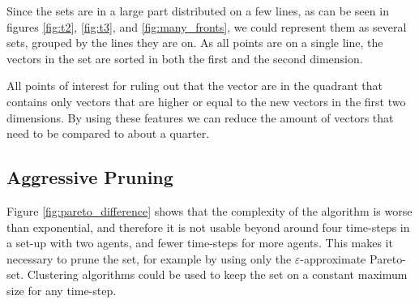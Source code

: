 \documentclass{article}
\begin{document}
\begin{multicols}{2}
		Since the sets are in a large part distributed on a few lines, as can be
		seen in figures \ref{fig:t2}, \ref{fig:t3}, and \ref{fig:many_fronts}, we
		could represent them as several sets, grouped by the lines they are on.
		As all points are on a single line, the vectors in the set are sorted in
		both the first and the second dimension.

		All points of interest for ruling out that the vector are in the quadrant
		that contains only vectors that are higher or equal to the new vectors in
		the first two dimensions. By using these features we can reduce the
		amount of vectors that need to be compared to about a quarter.

	\subsection{Aggressive Pruning}
		\label{sub:aggressive_pruning}
		Figure \ref{fig:pareto_difference} shows that the complexity of the
		algorithm is worse than exponential, and therefore it is not usable
		beyond around four time-steps in a set-up with two agents, and fewer
		time-steps for more agents. This makes it necessary to prune the set, for
		example by using only the $\varepsilon$-approximate Pareto-set.
		Clustering algorithms could be used to keep the set on a constant maximum
		size for any time-step.
	\end{multicols}
	\pagebreak

	
	
\end{document}
